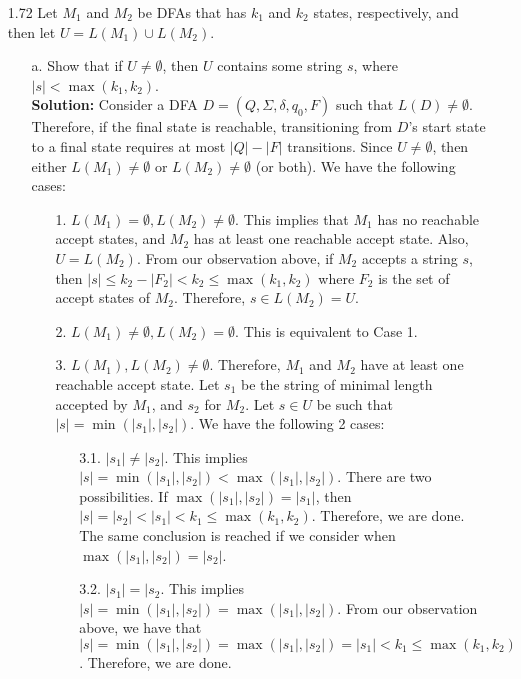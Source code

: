 \begin{enumerate}
\item[1.72]Let $M_1$ and $M_2$ be DFAs that has $k_1$ and $k_2$ states, respectively, and then let $U = L(M_1) \cup L(M_2)$. 
\begin{enumerate}
\item[a.]Show that if $U \ne \emptyset$, then $U$ contains some string $s$, where $|s| < \max(k_1, k_2)$.
\\
\textbf{Solution:} Consider a DFA $D = (Q, \Sigma, \delta, q_0, F)$ such that $L(D) \ne \emptyset$. Therefore, if the final state is reachable, transitioning from $D$'s start state to a final state requires at most $|Q| - |F|$ transitions. Since $U \ne \emptyset$, then either $L(M_1) \ne \emptyset$ or $L(M_2) \ne \emptyset$ (or both). We have the following cases:
\begin{enumerate}
\item[1.] $L(M_1) = \emptyset, L(M_2) \ne \emptyset$. This implies that $M_1$ has no reachable accept states, and $M_2$ has at least one reachable accept state. Also, $U = L(M_2)$. From our observation above, if $M_2$ accepts a string $s$, then $|s| \le k_2 - |F_2| < k_2 \le \max(k_1, k_2)$ where $F_2$ is the set of accept states of $M_2$. Therefore, $s \in L(M_2) = U$.

\item[2.] $L(M_1) \ne \emptyset, L(M_2) = \emptyset$. This is equivalent to Case 1.

\item[3.] $L(M_1), L(M_2) \ne \emptyset$. Therefore, $M_1$ and $M_2$ have at least one reachable accept state. Let $s_1$ be the string of minimal length accepted by $M_1$, and $s_2$ for $M_2$. Let $s \in U$ be such that $|s| = \min(|s_1|, |s_2|)$. We have the following 2 cases:
\begin{enumerate}
\item[3.1.] $|s_1| \ne |s_2|$. This implies $|s| = \min(|s_1|, |s_2|) < \max(|s_1|, |s_2|)$. There are two possibilities. If $\max(|s_1|, |s_2|) = |s_1|$, then $|s| = |s_2| < |s_1| < k_1 \le \max(k_1, k_2)$. Therefore, we are done. The same conclusion is reached if we consider when $\max(|s_1|, |s_2|) = |s_2|$. 

\item[3.2.] $|s_1| = |s_2$. This implies $|s| = \min(|s_1|, |s_2|) = \max(|s_1|, |s_2|)$. From our observation above, we have that $|s| = \min(|s_1|, |s_2|) = \max(|s_1|, |s_2|) = |s_1| < k_1 \le \max(k_1, k_2)$. Therefore, we are done.
\end{enumerate}
\end{enumerate}


\end{enumerate}
\end{enumerate}
